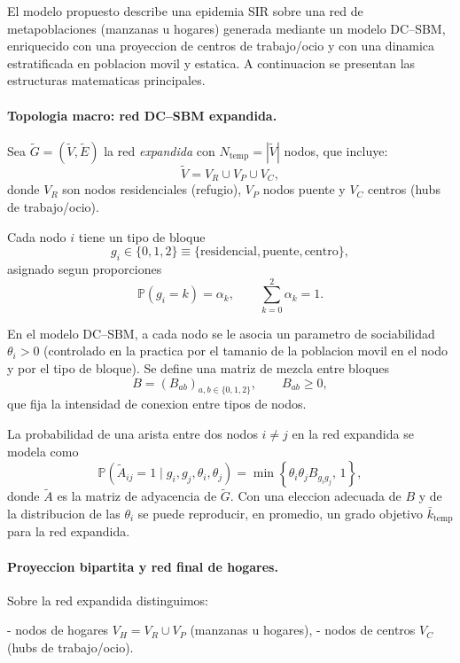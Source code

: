 El modelo propuesto describe una epidemia SIR sobre una red de metapoblaciones (manzanas u hogares) generada mediante un modelo DC--SBM, enriquecido con una proyeccion de centros de trabajo/ocio y con una dinamica estratificada en poblacion movil y estatica. A continuacion se presentan las estructuras matematicas principales.

\paragraph*{Topologia macro: red DC--SBM expandida.}

Sea $\tilde{G} = (\tilde{V}, \tilde{E})$ la red \emph{expandida} con $N_{\text{temp}} = |\tilde{V}|$ nodos, que incluye:
\[
\tilde{V} = V_R \cup V_P \cup V_C,
\]
donde $V_R$ son nodos residenciales (refugio), $V_P$ nodos puente y $V_C$ centros (hubs de trabajo/ocio).

Cada nodo $i$ tiene un tipo de bloque
\[
g_i \in \{0,1,2\} \equiv \{\text{residencial}, \text{puente}, \text{centro}\},
\]
asignado segun proporciones
\[
\mathbb{P}(g_i = k) = \alpha_k, \qquad \sum_{k=0}^2 \alpha_k = 1.
\]

En el modelo DC--SBM, a cada nodo se le asocia un parametro de sociabilidad $\theta_i > 0$ (controlado en la practica por el tamanio de la poblacion movil en el nodo y por el tipo de bloque). Se define una matriz de mezcla entre bloques
\[
B = (B_{ab})_{a,b \in \{0,1,2\}}, \qquad B_{ab} \ge 0,
\]
que fija la intensidad de conexion entre tipos de nodos.

La probabilidad de una arista entre dos nodos $i \ne j$ en la red expandida se modela como
\begin{equation}
  \mathbb{P}(\tilde{A}_{ij} = 1 \mid g_i, g_j, \theta_i, \theta_j)
  = \min\!\left\{ \theta_i \theta_j B_{g_i g_j},\, 1 \right\},
\end{equation}
donde $\tilde{A}$ es la matriz de adyacencia de $\tilde{G}$. Con una eleccion adecuada de $B$ y de la distribucion de las $\theta_i$ se puede reproducir, en promedio, un grado objetivo $\bar{k}_{\text{temp}}$ para la red expandida.

\paragraph*{Proyeccion bipartita y red final de hogares.}

Sobre la red expandida distinguimos:

- nodos de hogares $V_H = V_R \cup V_P$ (manzanas u hogares),  
- nodos de centros $V_C$ (hubs de trabajo/ocio).


